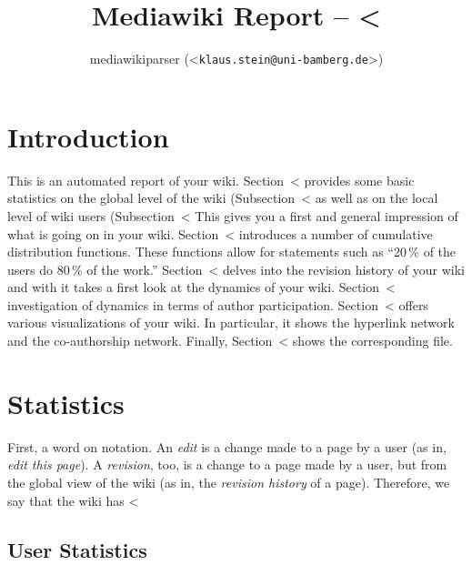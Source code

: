 \documentclass{scrartcl}
\title{Mediawiki Report -- <%
}
\author{mediawikiparser (<\texttt{klaus.stein@uni-bamberg.de}>)}
\begin{document}
\maketitle

\section{Introduction} %
\label{sec:introduction}

This is an automated report of your wiki. 
Section~<%
provides some basic statistics on the global level of the wiki 
(Subsection~<%
as well as on the local level of wiki users 
(Subsection~<%
This gives you a first and general impression of what is 
going on in your wiki. 
Section~<%
introduces a number of cumulative distribution functions. 
These functions allow for statements such as ``20\,\% of 
the users do 80\,\% of the work.'' 
Section~<%
delves into the revision history of your wiki and with it takes a 
first look at the dynamics of your wiki. 
Section~<%
investigation of dynamics in terms of author participation. 
Section~<%
offers various visualizations of your wiki. In particular, it shows 
the hyperlink network and the co-authorship network. Finally, 
Section~<%
shows the corresponding file.


\section{Statistics} %
\label{sec:statistics}

First, a word on notation. An \emph{edit} is a change made to a page by a user (as in, \emph{edit this page}). A \emph{revision}, too, is a change to a page made by a user, but from the global view of the wiki (as in, the \emph{revision history} of a page). Therefore, we say that the wiki has <%

\subsection{User Statistics} %
\label{sub:user_statistics}
\end{document}
